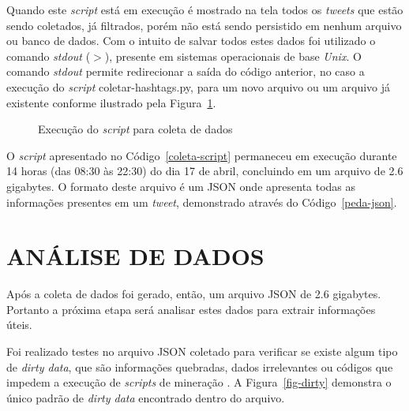 Quando este \textit{script} está em execução é mostrado na tela todos os \textit{tweets} que estão sendo coletados, já filtrados, porém não está sendo persistido em nenhum arquivo ou banco de dados. Com o intuito de salvar todos estes dados foi utilizado o comando \textit{stdout} ($>$), presente em sistemas operacionais de base \textit{Unix}. O comando \textit{stdout} permite redirecionar a saída do código anterior, no caso a execução do \textit{script} coletar-hashtags.py, para um novo arquivo ou um arquivo já existente conforme ilustrado pela Figura~\ref{exec-coleta}.

\begin{figure}[h]
	\centering
	\caption{Execução do \textit{script} para coleta de dados}
	\vspace{-0.3cm}
	\label{exec-coleta}
\end{figure}

O \textit{script} apresentado no Código~\ref{coleta-script} permaneceu em execução durante 14 horas (das 08:30 às 22:30) do dia 17 de abril, concluindo em um arquivo de 2.6 gigabytes. O formato deste arquivo é um JSON onde apresenta todas as informações presentes em um \textit{tweet}, demonstrado através do Código~\ref{peda-json}.



\section{ANÁLISE DE DADOS}
Após a coleta de dados foi gerado, então, um arquivo JSON de 2.6 gigabytes. Portanto a próxima etapa será analisar estes dados para extrair informações úteis.

Foi realizado testes no arquivo JSON coletado para verificar se existe algum tipo de \textit{dirty data}, que são informações quebradas, dados irrelevantes ou códigos que impedem a execução de \textit{scripts} de mineração \cite{dirty-data}. A Figura~\ref{fig-dirty} demonstra o único padrão de \textit{dirty data} encontrado dentro do arquivo.

